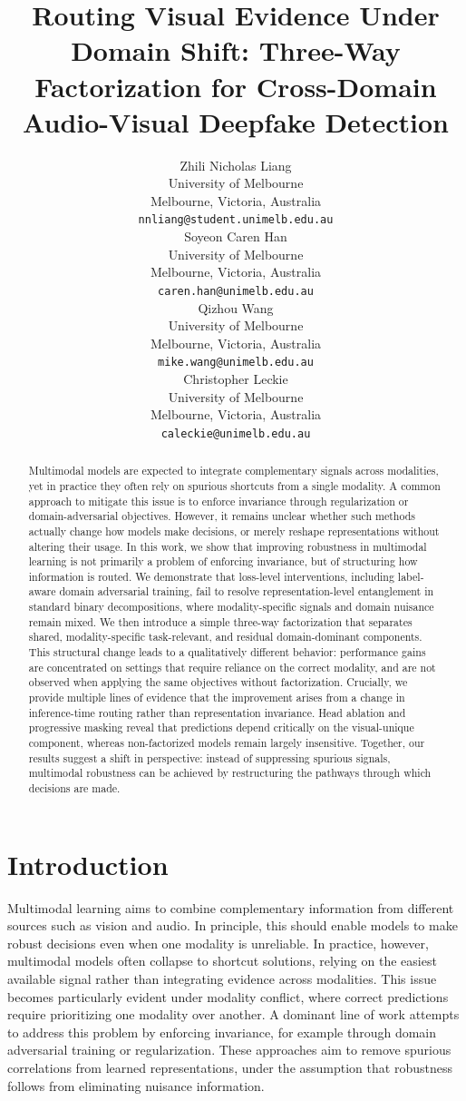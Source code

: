 \documentclass{article}
\title{Routing Visual Evidence Under Domain Shift: Three-Way Factorization for Cross-Domain Audio-Visual Deepfake Detection}
\author{%
  Zhili Nicholas Liang \\
  University of Melbourne \\
  Melbourne, Victoria, Australia \\
  \texttt{nnliang@student.unimelb.edu.au} \\
  \And
  Soyeon Caren Han \\
  University of Melbourne \\
  Melbourne, Victoria, Australia \\
  \texttt{caren.han@unimelb.edu.au} \\
  \And
  Qizhou Wang \\
  University of Melbourne \\
  Melbourne, Victoria, Australia \\
  \texttt{mike.wang@unimelb.edu.au} \\
  \And
  Christopher Leckie \\
  University of Melbourne \\
  Melbourne, Victoria, Australia \\
  \texttt{caleckie@unimelb.edu.au} \\
}
\begin{document}
\maketitle

\begin{abstract}
Multimodal models are expected to integrate complementary signals across modalities, yet in practice they often rely on spurious shortcuts from a single modality. A common approach to mitigate this issue is to enforce invariance through regularization or domain-adversarial objectives. However, it remains unclear whether such methods actually change how models make decisions, or merely reshape representations without altering their usage.
In this work, we show that improving robustness in multimodal learning is not primarily a problem of enforcing invariance, but of structuring how information is routed. We demonstrate that loss-level interventions, including label-aware domain adversarial training, fail to resolve representation-level entanglement in standard binary decompositions, where modality-specific signals and domain nuisance remain mixed.
We then introduce a simple three-way factorization that separates shared, modality-specific task-relevant, and residual domain-dominant components. This structural change leads to a qualitatively different behavior: performance gains are concentrated on settings that require reliance on the correct modality, and are not observed when applying the same objectives without factorization.
Crucially, we provide multiple lines of evidence that the improvement arises from a change in inference-time routing rather than representation invariance. Head ablation and progressive masking reveal that predictions depend critically on the visual-unique component, whereas non-factorized models remain largely insensitive.
Together, our results suggest a shift in perspective: instead of suppressing spurious signals, multimodal robustness can be achieved by restructuring the pathways through which decisions are made.
\end{abstract}

\section{Introduction}

Multimodal learning aims to combine complementary information from different sources such as vision and audio. In principle, this should enable models to make robust decisions even when one modality is unreliable. In practice, however, multimodal models often collapse to shortcut solutions, relying on the easiest available signal rather than integrating evidence across modalities. This issue becomes particularly evident under modality conflict, where correct predictions require prioritizing one modality over another.
A dominant line of work attempts to address this problem by enforcing invariance, for example through domain adversarial training or regularization. These approaches aim to remove spurious correlations from learned representations, under the assumption that robustness follows from eliminating nuisance information.
\end{document}
